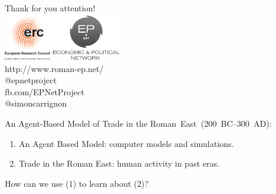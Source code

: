 \documentclass[10pt, notes=show]{beamer}
\begin{document}
\begin{frame}
	\begin{center}
		\Large
    Thank for you attention!\\
		\includegraphics[width=2cm]{images/LOGO-ERC.jpg} \hfil	\includegraphics[width=3cm]{../../../logos/epnetLogo.png}\\
		\vspace{1cm}
		\scriptsize
			http://www.roman-ep.net/\\
			@epnetproject\\
			fb.com/EPNetProject\\
			@simoncarrignon
	\end{center}


\end{frame}

\begin{frame}{}
    An Agent-Based Model of Trade in the Roman~East~(200~BC--300~AD):
    \begin{center}
        \parbox{.6\textwidth}{
            \begin{enumerate}
                \item An Agent Based Model: computer models and simulations.
                \item Trade in the Roman East: human activity in past eras. 
            \end{enumerate}
        }
    \end{center}
    How can we use (\textcolor{tracblue}{1}) to learn about (\textcolor{tracblue}{2})?
    \vfill

\end{frame}
\end{document}
